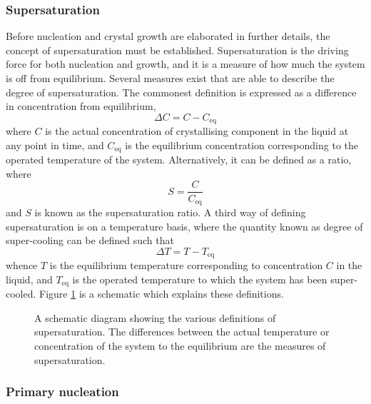 \subsubsection{Supersaturation}

Before nucleation and crystal growth are elaborated in further details, the concept of supersaturation must be established. Supersaturation is the driving force for both nucleation and growth, and it is a measure of how much the system is off from equilibrium. Several measures exist that are able to describe the degree of supersaturation. The commonest definition is expressed as a difference in concentration from equilibrium,
\begin{equation}\label{eq:deltaC}
    \Delta C = C - C_{\mathrm{eq}}
\end{equation}
where $C$ is the actual concentration of crystallising component in the liquid at any point in time, and $C_{\mathrm{eq}}$ is the equilibrium concentration corresponding to the operated temperature of the system. Alternatively, it can be defined as a ratio, where
\begin{equation} \label{eq: supersaturation ratio}
    S = \frac{C}{C_{\mathrm{eq}}}
\end{equation}
and $S$ is known as the supersaturation ratio. A third way of defining supersaturation is on a temperature basis, where the quantity known as degree of super-cooling can be defined such that
\begin{equation} \label{eq:deltaT}
     \Delta T = T - T_{\mathrm{eq}}
\end{equation}
whence $T$ is the equilibrium temperature corresponding to concentration $C$ in the liquid, and $T_{\mathrm{eq}}$ is the operated temperature to which the system has been super-cooled. Figure \ref{fig:supersaturation} is a schematic which explains these definitions.

\begin{figure}[h]
\centering

\caption{A schematic diagram showing the various definitions of supersaturation. The differences between the actual temperature or concentration of the system to the equilibrium are the measures of supersaturation.}
\label{fig:supersaturation}
\end{figure}

\subsubsection{Primary nucleation}

